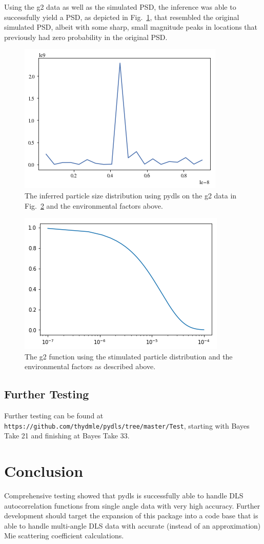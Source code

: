 \documentclass[11pt]{article}
\begin{document}
Using the g2 data as well as the simulated PSD, the inference was able to successfully yield a PSD, as depicted in Fig.~\ref{fig:take20infer}, that resembled the original simulated PSD, albeit with some sharp, small magnitude peaks in locations that previously had zero probability in the original PSD. 

\begin{figure}
\centering
\includegraphics[width=0.4\linewidth]{take20infer.png}
\caption{The inferred particle size distribution using pydls on the g2 data in Fig.~\ref{fig:take20g2} and the environmental factors above.}
\label{fig:take20infer}
\end{figure}


\begin{figure}
\centering
\includegraphics[width=0.4\linewidth]{take20g2.png}
\caption{The g2 function using the stimulated particle distribution and the environmental factors as described above.}
\label{fig:take20g2}
\end{figure}

\subsection{Further Testing}
Further testing can be found at \verb#https://github.com/thydmle/pydls/tree/master/Test#, starting with Bayes Take 21 and finishing at Bayes Take 33. 

\section{Conclusion}
Comprehensive testing showed that pydls is successfully able to handle DLS autocorrelation functions from single angle data with very high accuracy. Further development should target the expansion of this package into a code base that is able to handle multi-angle DLS data with accurate (instead of an approximation) Mie scattering coefficient calculations.
\end{document}
